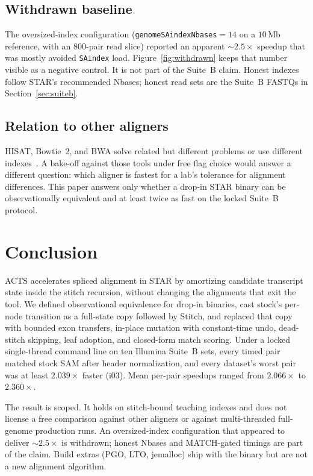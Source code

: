 \documentclass[11pt]{article}
\newcommand{\STAR}{STAR\xspace}
\newcommand{\ACTS}{ACTS\xspace}
\begin{document}
\subsection{Withdrawn baseline}
\label{sec:withdrawn}

The oversized-index configuration
(\texttt{genomeSAindexNbases}${}=14$ on a $10\,\mathrm{Mb}$ reference, with an
$800$-pair read slice) reported an apparent $\sim$$2.5\times$ speedup that was
mostly avoided \texttt{SAindex} load.
Figure~\ref{fig:withdrawn} keeps that number visible as a negative control.
It is not part of the Suite~B claim.
Honest indexes follow \STAR's recommended Nbases; honest read sets are the
Suite~B FASTQs in Section~\ref{sec:suiteb}.

\subsection{Relation to other aligners}
\label{sec:others}

HISAT, Bowtie~2, and BWA solve related but different problems or use different
indexes~\cite{kim2015hisat,langmead2012bowtie2,li2009bwa}.
A bake-off against those tools under free flag choice would answer a different
question: which aligner is fastest for a lab's tolerance for alignment
differences.
This paper answers only whether a drop-in \STAR binary can be observationally
equivalent and at least twice as fast on the locked Suite~B protocol.

\section{Conclusion}
\label{sec:conclusion}

\ACTS accelerates spliced alignment in \STAR by amortizing candidate transcript
state inside the stitch recursion, without changing the alignments that exit
the tool.
We defined observational equivalence for drop-in binaries, cast stock's
per-node transition as a full-state copy followed by $\mathrm{Stitch}$, and
replaced that copy with bounded exon transfers, in-place mutation with
constant-time undo, dead-stitch skipping, leaf adoption, and closed-form match
scoring.
Under a locked single-thread command line on ten Illumina Suite~B sets, every
timed pair matched stock SAM after header normalization, and every dataset's
worst pair was at least $2.039\times$ faster (i03).
Mean per-pair speedups ranged from $2.066\times$ to $2.360\times$.

The result is scoped.
It holds on stitch-bound teaching indexes and does not license a free
comparison against other aligners or against multi-threaded full-genome
production runs.
An oversized-index configuration that appeared to deliver $\sim$$2.5\times$ is
withdrawn; honest Nbases and MATCH-gated timings are part of the claim.
Build extras (PGO, LTO, jemalloc) ship with the binary but are not a new
alignment algorithm.
\end{document}
